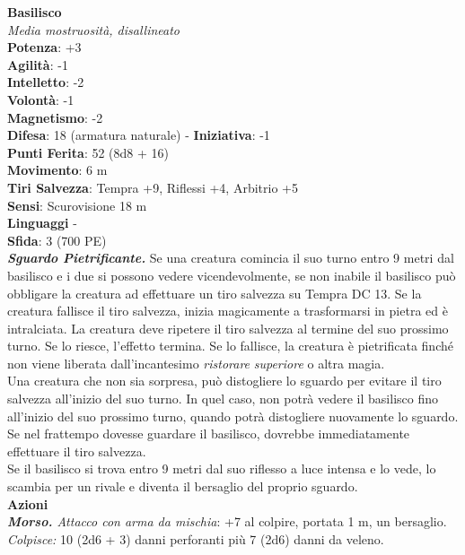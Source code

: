 \begin{multicols}{2}
\medskip\textbf{Basilisco}\\
\emph{Media mostruosità, disallineato}\\
\textbf{Potenza}: +3\\
\textbf{Agilità}: -1\\
\textbf{Intelletto}: -2\\
\textbf{Volontà}: -1\\
\textbf{Magnetismo}: -2\\
\textbf{Difesa}: 18 (armatura naturale) - \textbf{Iniziativa}: -1\\
\textbf{Punti Ferita}: 52 (8d8 + 16)\\
\textbf{Movimento}: 6 m\\
\textbf{Tiri Salvezza}: Tempra +9, Riflessi +4, Arbitrio +5\\
\textbf{Sensi}: Scurovisione 18 m\\
\textbf{Linguaggi} -\\
\textbf{Sfida}: 3 (700 PE)\smallskip\\
\emph{\textbf{Sguardo Pietrificante.}} Se una creatura comincia il suo turno entro 9 metri dal basilisco e i due si possono vedere vicendevolmente, se non inabile il basilisco può obbligare la creatura ad effettuare un tiro salvezza su Tempra DC  13. Se la creatura fallisce il tiro  salvezza, inizia magicamente a trasformarsi in pietra ed è   intralciata. La creatura deve ripetere il tiro salvezza al termine del   suo prossimo turno. Se lo riesce, l'effetto termina. Se lo fallisce,   la creatura è pietrificata finché non viene liberata dall'incantesimo  \emph{ristorare} \emph{superiore} o altra magia. \\
Una creatura che non sia sorpresa, può distogliere lo sguardo per evitare il tiro salvezza all'inizio del suo turno. In quel caso, non potrà vedere il basilisco fino all'inizio del suo prossimo turno, quando potrà distogliere nuovamente lo sguardo. Se nel frattempo dovesse guardare il basilisco, dovrebbe immediatamente effettuare il tiro salvezza.\\
Se il basilisco si trova entro 9 metri dal suo riflesso a luce intensa e lo vede, lo scambia per un rivale e diventa il bersaglio del proprio sguardo.\\
\smallskip\textbf{Azioni}\\
\emph{\textbf{Morso.} Attacco con arma da mischia}: +7 al colpire, portata 1 m, un bersaglio. \\
\emph{Colpisce:} 10 (2d6 + 3) danni perforanti più 7 (2d6) danni da veleno.\\

\end{multicols}
